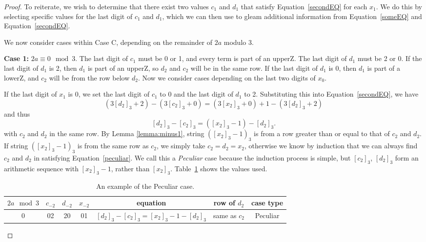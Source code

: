 \documentclass[12pt,reqno]{article}
\theoremstyle{plain}
\theoremstyle{definition}
\theoremstyle{remark}
\begin{document}
\begin{proof}
To reiterate, we wish to determine that there exist two values $c_1$ and $d_1$ that satisfy Equation~\eqref{secondEQ} for each $x_1$. We do this by selecting specific values for the last digit of $c_1$ and $d_1$, which we can then use to gleam additional information from Equation~\eqref{someEQ} and Equation~\eqref{secondEQ}. 

We now consider cases within Case C, depending on the remainder of $2a$ modulo 3.

\textbf{Case 1:} $2a \equiv 0 \mod{3}$. The last digit of $c_1$ must be 0 or 1, and every term is part of an upperZ. The last digit of $d_1$ must be 2 or 0. If the last digit of $d_1$ is 2, then $d_1$ is part of an upperZ, so $d_2$ and $c_2$ will be in the same row. If the last digit of $d_1$ is 0, then $d_1$ is part of a lowerZ, and $c_2$ will be from the row below $d_2$. Now we consider cases depending on the last two digits of $x_0$.

If the last digit of $x_1$ is 0, we set the last digit of $c_1$ to $0$ and the last digit of $d_1$ to 2. Substituting this into Equation~\eqref{secondEQ}, we have
\[(3[d_2]_3+2)-(3[c_2]_3+0) = (3[x_2]_3+0)+1-(3[d_2]_3+2)\]
and thus
\begin{equation}\label{peculiar}
[d_2]_3-[c_2]_3 = ([x_2]_3 - 1) - [d_2]_3.
\end{equation}
with $c_2$ and $d_2$ in the same row. By Lemma \ref{lemma:minus1}, string $([x_2]_3-1)_3$ is from a row greater than or equal to that of $c_2$ and $d_2$. If string $([x_2]_3-1)_3$ is from the same row as $c_2$, we simply take $c_2 = d_2 = x_2$, otherwise we know by induction that we can always find $c_2$ and $d_2$ in satisfying Equation~\eqref{peculiar}. We call this a \textit{Peculiar} case because the induction process is simple, but $[c_2]_3$, $[d_2]_3$ form an arithmetic sequence with $[x_2]_3-1$, rather than $[x_2]_3$. Table~\ref{table:peculiar} shows the values used.
\begin{table}[ht!]
\begin{center}
\begin{tabular}{|c|c|c|c|c|c|c|}
\hline
 $2a \mod{3}$ & $c_{-2}$ & $d_{-2}$& $x_{-2}$ & equation & row of $d_2$ & case type\\
 \hline
 0 &  02 & 20  & 01 & $[d_2]_3-[c_2]_3 = [x_2]_3 - 1 - [d_2]_3$&  same as $c_2$ & Peculiar\\
  \hline
\end{tabular}
\caption{An example of the Peculiar case.}
\label{table:peculiar}
\end{center}
\end{table}



\end{proof}
\end{document}
